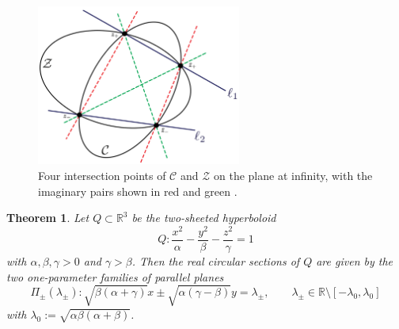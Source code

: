 \documentclass[10pt, a4paper]{article}
\theoremstyle{BoldTopSpacing}
\newtheorem{theorem}{Theorem}[section]
\theoremstyle{BoldTopSpacing}
\theoremstyle{BoldTopSpacing}
\theoremstyle{BoldTopBottomSpacing}
\theoremstyle{BoldTopSpacing}
\theoremstyle{BoldTopBottomSpacing}
\theoremstyle{remark}
\begin{document}
\begin{figure}[H]
    \centering
    \includegraphics[width=0.6\textwidth]{conics-through-four-points.png}
    \caption{Four intersection points of $\mathcal{C}$ and $\mathcal{Z}$ on the plane at infinity, with the imaginary pairs shown in red and green \cite[\textcolor{CitationColor}{p.~204}]{sommervilleAnalyticalGeometry}.}
    \label{fig:conics-through-four-points}
\end{figure}

\begin{theorem}
\label{thm:circular-sections-hyperboloid}
Let $Q \subset \mathbb{R}^3$ be the two-sheeted hyperboloid
\begin{equation}
\label{eq:two-sheeted-alpha-beta-gamma}
Q : \frac{x^2}{\alpha} - \frac{y^2}{\beta} - \frac{z^2}{\gamma} = 1
\end{equation}
with $\alpha, \beta, \gamma > 0$ and $\gamma > \beta$. Then the real circular sections of $Q$ are given by the two one-parameter families of parallel planes
\begin{equation}
\label{eq:planes-two-sheeted}
\Pi_{\pm}(\lambda_{\pm}) :\sqrt{\beta (\alpha + \gamma)} x \pm \sqrt{\alpha (\gamma - \beta)} y = \lambda_{\pm}, \quad \quad \lambda_{\pm} \in \mathbb{R} \setminus \left[-\lambda_{0}, \lambda_{0} \right]
\end{equation}
with $\lambda_{0} := \sqrt{\alpha \beta (\alpha+\beta)}$.
\end{theorem}
\end{document}
